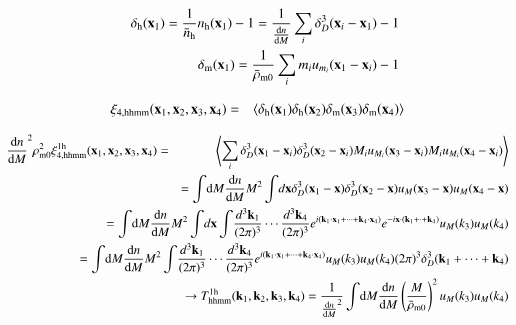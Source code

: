 \documentclass[onecolumn,notitlepage,showpacs,amsmath,amssymb,prd,floatfix]{revtex4-1}
\def\ave#1{\left\langle #1 \right\rangle}
\newcommand{\bx}{{\bf x}}
\newcommand{\bk}{{\bf k}}
\newcommand{\dr}{\mathrm{d}}
\newcommand{\deltam}{\delta_{\mathrm{m}}}
\newcommand{\bh}{\mathrm{h}}
\newcommand{\bnh}{\frac{\dr n}{\dr M}}
\begin{document}
\begin{eqnarray}
 &&\delta_\bh(\bx_1)=\frac{1}{\bar{n}_\bh}n_\bh(\bx_1)-1=\frac{1}{\bnh}\sum_{i}\delta_D^3(\bx_i-\bx_1)-1\nonumber\\
 &&\deltam(\bx_1)=\frac{1}{\bar{\rho}_{\rm m0}}\sum_i m_iu_{m_i}(\bx_1-\bx_i)-1
\end{eqnarray}



\begin{eqnarray}
 \xi_{\rm 4, hhmm}(\bx_1,\bx_2,\bx_3,\bx_4)&=&
  \ave{\delta_\bh(\bx_1)\delta_\bh(\bx_2)\delta_{\rm
  m}(\bx_3)\delta_{\rm m}(\bx_4)}
\end{eqnarray}

\begin{eqnarray}
\bnh^2\rho_{\rm m0}^2 \xi^{{\rm 1h}}_{\rm 4,
 hhmm}(\bx_1,\bx_2,\bx_3,\bx_4)&=&
 \ave{\sum_i \delta_D^3(\bx_1-\bx_i)\delta_D^3(\bx_2-\bx_i)
 M_iu_{M_i}(\bx_3-\bx_i)M_iu_{M_i}(\bx_4-\bx_i)
 }\nonumber\\
 &&\hspace{-8em}=\int\!\dr M \frac{\dr n}{\dr M}M^2 \int\!d\bx \delta_D^3(\bx_1-\bx)\delta_D^3(\bx_2-\bx)
 u_{M}(\bx_3-\bx)u_{M}(\bx_4-\bx)\nonumber\\
 &&\hspace{-8em}=\int\!\dr M \frac{\dr n}{\dr M}M^2 \int\!d\bx
  \int\!\frac{d^3\bk_1}{(2\pi)^3}\cdots\frac{d^3\bk_4}{(2\pi)^3}
  e^{i(\bk_1\cdot\bx_1+\cdots+\bk_4\cdot\bx_4)}e^{-i\bx\cdot(\bk_1+\cdot+\bk_4)}
 u_{M}(k_3)u_{M}(k_4)\nonumber\\
 &&\hspace{-8em}=\int\!\dr M \frac{\dr n}{\dr M}M^2 
  \int\!\frac{d^3\bk_1}{(2\pi)^3}\cdots\frac{d^3\bk_4}{(2\pi)^3}
  e^{i(\bk_1\cdot\bx_1+\cdots+\bk_4\cdot\bx_4)}
  u_{M}(k_3)u_{M}(k_4)(2\pi)^3\delta_D^3(\bk_1+\cdots+\bk_4)
  \nonumber\\
 &&\hspace{-8em}\rightarrow T^{\rm 1h}_{\rm hhmm}(\bk_1,\bk_2,\bk_3,\bk_4)=\frac{1}{\bnh^2}
  \int\!\dr M\frac{\dr n}{\dr M}\left(\frac{M}{\bar{\rho}_{\rm m0}}\right)^2 u_M(k_3)u_M(k_4)
\end{eqnarray}
\end{document}
